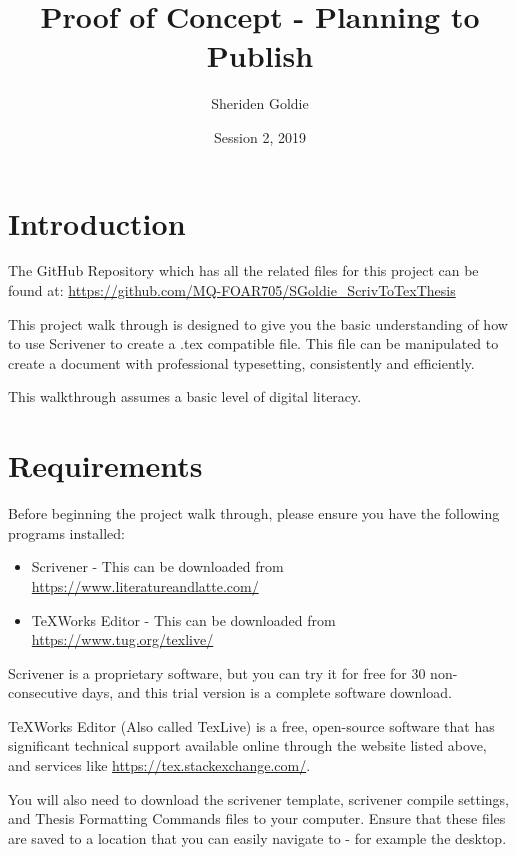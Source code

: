 \documentclass{article}
\title{Proof of Concept - Planning to Publish}
\author{Sheriden Goldie}
\date{Session 2, 2019}
\begin{document}
\maketitle

\tableofcontents

\pagebreak

\section{Introduction}

The GitHub Repository which has all the related files for this project can be found at: \url{https://github.com/MQ-FOAR705/SGoldie_ScrivToTexThesis}

This project walk through is designed to give you the basic understanding of how to use Scrivener to create a .tex compatible file. This file can be manipulated to create a document with professional typesetting, consistently and efficiently. 

This walkthrough assumes a basic level of digital literacy.

\section{Requirements}

Before beginning the project walk through, please ensure you have the following programs installed:

\begin{itemize}
    \item Scrivener - This can be downloaded from \url{https://www.literatureandlatte.com/}
    \item TeXWorks Editor - This can be downloaded from \url{https://www.tug.org/texlive/}
\end{itemize}

Scrivener is a proprietary software, but you can try it for free for 30 non-consecutive days, and this trial version is a complete software download. 

TeXWorks Editor (Also called TexLive) is a free, open-source software that has significant technical support available online through the website listed above, and services like \url{https://tex.stackexchange.com/}.

You will also need to download the scrivener template, scrivener compile settings, and Thesis Formatting Commands files to your computer. Ensure that these files are saved to a location that you can easily navigate to - for example the desktop.
\end{document}

